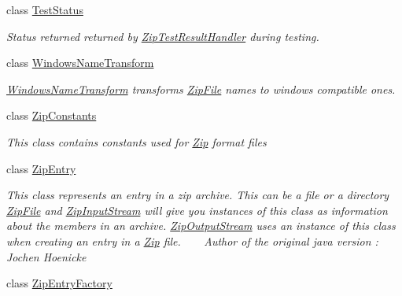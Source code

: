\begin{DoxyCompactItemize}
class \hyperlink{class_i_c_sharp_code_1_1_sharp_zip_lib_1_1_zip_1_1_test_status}{Test\+Status}
\begin{DoxyCompactList}\small\item\em Status returned returned by \hyperlink{namespace_i_c_sharp_code_1_1_sharp_zip_lib_1_1_zip_a80ec37fb8220f68e710a9beff884a743}{Zip\+Test\+Result\+Handler} during testing. \end{DoxyCompactList}\item 
class \hyperlink{class_i_c_sharp_code_1_1_sharp_zip_lib_1_1_zip_1_1_windows_name_transform}{Windows\+Name\+Transform}
\begin{DoxyCompactList}\small\item\em \hyperlink{class_i_c_sharp_code_1_1_sharp_zip_lib_1_1_zip_1_1_windows_name_transform}{Windows\+Name\+Transform} transforms \hyperlink{class_i_c_sharp_code_1_1_sharp_zip_lib_1_1_zip_1_1_zip_file}{Zip\+File} names to windows compatible ones. \end{DoxyCompactList}\item 
class \hyperlink{class_i_c_sharp_code_1_1_sharp_zip_lib_1_1_zip_1_1_zip_constants}{Zip\+Constants}
\begin{DoxyCompactList}\small\item\em This class contains constants used for \hyperlink{namespace_i_c_sharp_code_1_1_sharp_zip_lib_1_1_zip}{Zip} format files \end{DoxyCompactList}\item 
class \hyperlink{class_i_c_sharp_code_1_1_sharp_zip_lib_1_1_zip_1_1_zip_entry}{Zip\+Entry}
\begin{DoxyCompactList}\small\item\em This class represents an entry in a zip archive. This can be a file or a directory \hyperlink{class_i_c_sharp_code_1_1_sharp_zip_lib_1_1_zip_1_1_zip_file}{Zip\+File} and \hyperlink{class_i_c_sharp_code_1_1_sharp_zip_lib_1_1_zip_1_1_zip_input_stream}{Zip\+Input\+Stream} will give you instances of this class as information about the members in an archive. \hyperlink{class_i_c_sharp_code_1_1_sharp_zip_lib_1_1_zip_1_1_zip_output_stream}{Zip\+Output\+Stream} uses an instance of this class when creating an entry in a \hyperlink{namespace_i_c_sharp_code_1_1_sharp_zip_lib_1_1_zip}{Zip} file. ~\newline
 ~\newline
Author of the original java version \+: Jochen Hoenicke \end{DoxyCompactList}\item 
class \hyperlink{class_i_c_sharp_code_1_1_sharp_zip_lib_1_1_zip_1_1_zip_entry_factory}{Zip\+Entry\+Factory}

\end{DoxyCompactItemize}
